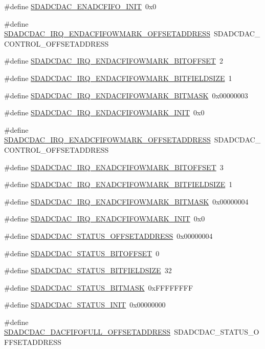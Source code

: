 \begin{DoxyCompactItemize}
\#define \hyperlink{a00569_a0054ebcf588e7ffa7fc41088e62675e1}{SDADCDAC\_\-ENADCFIFO\_\-INIT}~0x0
\item 
\#define \hyperlink{a00569_a1e2d91f4f8f76117ee53a10220f741cc}{SDADCDAC\_\-IRQ\_\-ENDACFIFOWMARK\_\-OFFSETADDRESS}~SDADCDAC\_\-CONTROL\_\-OFFSETADDRESS
\item 
\#define \hyperlink{a00569_ae314875d56d0112094e93733324281fe}{SDADCDAC\_\-IRQ\_\-ENDACFIFOWMARK\_\-BITOFFSET}~2
\item 
\#define \hyperlink{a00569_a836fccccba63ba2e908cfc5754b8efa6}{SDADCDAC\_\-IRQ\_\-ENDACFIFOWMARK\_\-BITFIELDSIZE}~1
\item 
\#define \hyperlink{a00569_a20d2edb0fd8b3fa21e6bd95069e8c081}{SDADCDAC\_\-IRQ\_\-ENDACFIFOWMARK\_\-BITMASK}~0x00000003
\item 
\#define \hyperlink{a00569_a565c364e51ed63492c1de14c5b7dd9fc}{SDADCDAC\_\-IRQ\_\-ENDACFIFOWMARK\_\-INIT}~0x0
\item 
\#define \hyperlink{a00569_a52ac483f553e6510a0c5e67097f5ccff}{SDADCDAC\_\-IRQ\_\-ENADCFIFOWMARK\_\-OFFSETADDRESS}~SDADCDAC\_\-CONTROL\_\-OFFSETADDRESS
\item 
\#define \hyperlink{a00569_a58730027359dab06968d076b1e622e04}{SDADCDAC\_\-IRQ\_\-ENADCFIFOWMARK\_\-BITOFFSET}~3
\item 
\#define \hyperlink{a00569_a72963b1c6a549288850e1d6bd9644058}{SDADCDAC\_\-IRQ\_\-ENADCFIFOWMARK\_\-BITFIELDSIZE}~1
\item 
\#define \hyperlink{a00569_a981852f99445cc20ff06549f66c27ca6}{SDADCDAC\_\-IRQ\_\-ENADCFIFOWMARK\_\-BITMASK}~0x00000004
\item 
\#define \hyperlink{a00569_a04f19eca51c7e5a0c66eafa22ff6d26e}{SDADCDAC\_\-IRQ\_\-ENADCFIFOWMARK\_\-INIT}~0x0
\item 
\#define \hyperlink{a00569_a92d06d95b8805d4ec8282bb8b1936bc1}{SDADCDAC\_\-STATUS\_\-OFFSETADDRESS}~0x00000004
\item 
\#define \hyperlink{a00569_a8315d1fda0ae489b98b99ccac1dace05}{SDADCDAC\_\-STATUS\_\-BITOFFSET}~0
\item 
\#define \hyperlink{a00569_a380f4ef370d0a9482876549e60c2c694}{SDADCDAC\_\-STATUS\_\-BITFIELDSIZE}~32
\item 
\#define \hyperlink{a00569_a03a1a2d082a80a59f01c97f51a336cd8}{SDADCDAC\_\-STATUS\_\-BITMASK}~0xFFFFFFFF
\item 
\#define \hyperlink{a00569_a579c3ef7fb238d8fa513a8657fa766d5}{SDADCDAC\_\-STATUS\_\-INIT}~0x00000000
\item 
\#define \hyperlink{a00569_ad52c6a3091dad645f6fb246abd5fd4b8}{SDADCDAC\_\-DACFIFOFULL\_\-OFFSETADDRESS}~SDADCDAC\_\-STATUS\_\-OFFSETADDRESS

\end{DoxyCompactItemize}
